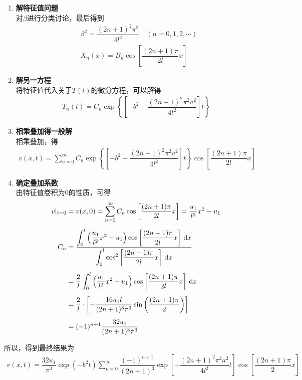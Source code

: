 \begin{enumerate}[{\textbf{步骤}}1 ]
\begin{itemize}
\begin{enumerate}
			\item \textbf{解特征值问题}\\
			对$\beta $进行分类讨论，最后得到
			\begin{align}
				& \beta^2 = \dfrac{(2n+1)^2\pi^2}{4l^2}\quad (n = 0,1,2,\cdots)\\
				& X_n(x) = B_n \cos \left[\dfrac{(2n+1)\pi}{2l}x\right]
			\end{align}
			
			\item \textbf{解另一方程}\\
			将特征值代入关于$T(t)$的微分方程，可以解得
			\begin{align}
				T_n(t) = C_n \exp \left \lbrace\left[-b^2 - \dfrac{(2n+1)^2\pi^2 a^2}{4l^2}\right]t\right\rbrace
			\end{align}
			
			\item \textbf{相乘叠加得一般解}\\
			相乘叠加，得
			\begin{align}
				v(x,t) = \sum_{n = 0}^{\infty} C_n \exp \left \lbrace\left[-b^2 - \dfrac{(2n+1)^2\pi^2 a^2}{4l^2}\right]t\right\rbrace \cos \left[\dfrac{(2n+1)\pi}{2l}x\right]
			\end{align}
			
			\item \textbf{确定叠加系数}\\
			由特征值卷积为0的性质，可得
			\begin{align}
				v|_{t = 0} &= v(x, 0) =\sum_{n = 0}^{\infty} C_n \cos\left[\dfrac{(2n+1)\pi}{2l}x\right] =  \dfrac{u_1}{l^2}x^2 - u_1\\[0.5em]
				C_n &= \dfrac{\displaystyle \int_0^l \left(\dfrac{u_1}{l^2}x^2 - u_1\right)\cos \left[\dfrac{(2n+1)\pi}{2l}x\right]  \, {\rm{d}} x}{ \displaystyle \int_0^l \cos^2 \left[\dfrac{(2n+1)\pi}{2l} x\right] \, {\rm{d}} x}\\[0.5em]
				& = \dfrac{2}{l} \int_0^l \left(\dfrac{u_1}{l^2}x^2 - u_1\right) \cos \left[\dfrac{(2n+1)\pi}{2l}x\right] \, {\rm{d}} x \notag \\[0.5em]
				& = \dfrac{2}{l} \cdot \left[- \dfrac{16 u_1 l}{(2n + 1)^3\pi^3} \sin \left(\dfrac{(2n + 1)\pi}{2}\right)\right]\notag \\[0.5em]
				& = (-1)^{n + 1} \dfrac{32 u_1}{(2n + 1)^3 \pi^3}
			\end{align}
		\end{enumerate}
		所以，得到最终结果为
		\begin{align}
			v(x, t) = \dfrac{32 u_1}{\pi^3} \exp(-b^2 t) \sum_{n = 0}^{\infty} \dfrac{(-1)^{n+1}}{(2n+1)^3} \exp \left[- \dfrac{(2n+1)^2\pi^2 a^2}{4l^2} t\right] \cos \left[ \dfrac{(2n+1)\pi}{2} x\right]
		\end{align}
		\vspace*{1em}
	

\end{itemize}
\end{enumerate}
